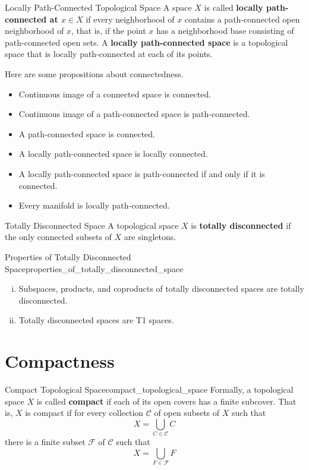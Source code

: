 \documentclass{report}
\begin{document}
\begin{definition}{Locally Path-Connected Topological Space}{}
	A space $X$ is called \textbf{locally path-connected at $x\in X$} if every neighborhood of $x$ contains a path-connected open neighborhood of $x$, that is, if the point $x$ has a neighborhood base consisting of path-connected open sets. A \textbf{locally path-connected space} is a topological space that is locally path-connected at each of its points.
\end{definition}


\begin{proposition}{}{}
	Here are some propositions about connectedness.
	\begin{itemize}
		\item Continuous image of a connected space is connected.
		\item Continuous image of a path-connected space is path-connected.
		\item A path-connected space is connected.
		\item A locally path-connected space is locally connected.
		\item A locally path-connected space is path-connected if and only if it is connected.
		\item Every manifold is locally path-connected.
	\end{itemize}

\end{proposition}

\begin{definition}{Totally Disconnected Space}{}
	A topological space $X$ is \textbf{totally disconnected} if the only connected subsets of $X$ are singletons.
\end{definition}

\begin{proposition}{Properties of Totally Disconnected Space}{properties_of_totally_disconnected_space}
	\begin{enumerate}[(i)]
		\item Subspaces, products, and coproducts of totally disconnected spaces are totally disconnected.
	
		\item Totally disconnected spaces are T1 spaces.
	\end{enumerate}
\end{proposition}

\section{Compactness}
\begin{definition}{Compact Topological Space}{compact_topological_space}
	Formally, a topological space $X$ is called \textbf{compact} if each of its open covers has a finite subcover. That is, $X$ is compact if for every collection $\mathcal{C}$ of open subsets of $X$ such that
	\[
		X=\bigcup_{C \in \mathcal{C}} C
	\]
	there is a finite subset $\mathcal{F}$ of $\mathcal{C}$ such that
	\[
		X=\bigcup_{F \in \mathcal{F}} F
	\]
\end{definition}
\end{document}
